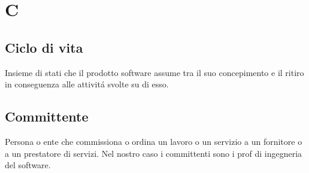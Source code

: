 \section{C}
\subsection{Ciclo di vita}%
Insieme di stati che il prodotto software assume tra il suo concepimento e il ritiro in 
conseguenza alle attivitá svolte su di esso.
\subsection{Committente}%
Persona o ente che commissiona o ordina un lavoro o un servizio a un fornitore o a un 
prestatore di servizi.
Nel nostro caso i committenti sono i prof di ingegneria del software.
\clearpage